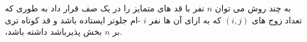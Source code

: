 \exercise
به چند روش می توان
$n$
نفر با قد های متمایز را در یک صف قرار داد به طوری که تعداد زوج های
$(i, j)$
که به ازای آن ها نفر
$i$
-ام جلوتر ایستاده باشد و قد کوتاه تری داشته باشد‫‪،‬‬ بر
$n$
بخش پذیرباشد.